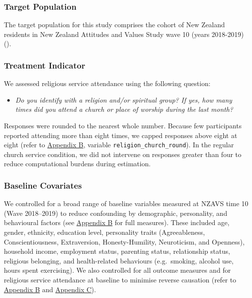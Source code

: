 \documentclass[
  single column]{article}
\providecommand{\tightlist}{%
  \setlength{\itemsep}{0pt}\setlength{\parskip}{0pt}}\usepackage{longtable,booktabs,array}
\begin{document}
\subsubsection{Target Population}\label{target-population}

The target population for this study comprises the cohort of New Zealand
residents in New Zealand Attitudes and Values Study wave 10 (years
2018-2019) ().

\subsubsection{Treatment Indicator}\label{treatment-indicator}

We assessed religious service attendance using the following question:

\begin{itemize}
\tightlist
\item
  \emph{Do you identify with a religion and/or spiritual group? If yes,
  how many times did you attend a church or place of worship during the
  last month?}
\end{itemize}

Responses were rounded to the nearest whole number. Because few
participants reported attending more than eight times, we capped
responses above eight at eight (refer to
\hyperref[appendix-baseline]{Appendix B}, variable
\texttt{religion\_church\_round}). In the regular church service
condition, we did not intervene on responses greater than four to reduce
computational burdens during estimation.

\subsubsection{Baseline Covariates}\label{baseline-covariates}

We controlled for a broad range of baseline variables measured at NZAVS
time 10 (Wave 2018--2019) to reduce confounding by demographic,
personality, and behavioural factors (see
\hyperref[appendix-baseline]{Appendix B} for full measures). These
included age, gender, ethnicity, education level, personality traits
(Agreeableness, Conscientiousness, Extraversion, Honesty-Humility,
Neuroticism, and Openness), household income, employment status,
parenting status, relationship status, religious belonging, and
health-related behaviours (e.g.~smoking, alcohol use, hours spent
exercising). We also controlled for all outcome measures and for
religious service attendance at baseline to minimise reverse causation
(refer to \hyperref[appendix-baseline]{Appendix B} and
\hyperref[appendix-confounding]{Appendix C}).
\end{document}
